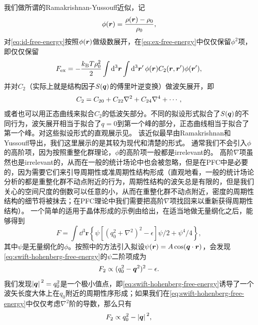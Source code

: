 \documentclass[hyperref, UTF8, a4paper]{ctexart}
\begin{document}
我们做所谓的Ramakrishnan-Yussouff近似，记
\begin{equation}
    \phi(\vb*{r}) = \frac{\rho(\vb*{r}) - \rho_0}{\rho_0},
\end{equation}
对\eqref{eq:id-free-energy}按照$\phi(\vb*{r})$做级数展开，在\eqref{eq:ex-free-energy}中仅仅保留$\phi^2$项，即仅仅保留
\begin{equation}
    F_\text{ex} = - \frac{k_\text{B} T \rho^2_0}{2} \int \dd[3]{\vb*{r}} \int \dd[3]{\vb*{r}'} {\phi(\vb*{r})} C_2(\vb*{r}, \vb*{r}') {\phi(\vb*{r}')}, 
\end{equation}
并对$C_2$（实际上就是结构因子$S(\vb*{q})$的傅里叶逆变换）做波矢展开，即
\begin{equation}
    C_2 = C_{20} + C_{22} \laplacian + C_{24} \nabla^4 + \cdots,
\end{equation}
或者也可以用正态曲线来拟合$C_2$的低波矢部分。不同的拟设形式拟合了$S(\vb*{q})$的不同行为，波矢展开相当于拟合了$q=0$到第一个峰的部分，正态曲线相当于拟合了第一个峰。对这些拟设形式的直观展示见。
该近似最早由Ramakrishnan和Yussouff导出\cite{PhysRevB.19.2775,Singh1991351}，我们这里展示的是其较为现代和清楚的形式\cite{pfc2009}。
通常我们不会引入$\phi$的高阶项，因为按照重整化群理论，$\phi$的高阶项一般都是irrelevant的\cite{kardar2007statistical}。
高阶$\nabla$项虽然也是irrelevant的，从而在一般的统计场论中也会被忽略，但是在PFC中是必要的，因为需要它们来引导周期性或准周期性结构形成（直观地看，一般的统计场论分析的都是重整化群不动点附近的行为，周期性结构的波矢总是有限的，但是我们关心的空间尺度的倒数可以任意的小，从而在重整化群不动点附近，密度的周期性结构的细节将被抹去；在PFC理论中我们需要把高阶$\nabla$项找回来以重新获得周期性结构）。
一个简单的适用于晶体形成的示例由\cite{PhysRevLett.88.245701}给出，在适当地做无量纲化之后，能够得到
\begin{equation}
    F = \int \dd^3 \boldsymbol{r}\left\{\psi\left[\left(q_{0}^{2}+\nabla^{2}\right)^{2}-\epsilon\right] \psi / 2+\psi^{4} / 4\right\},
    \label{eq:swift-hohenberg-free-energy}
\end{equation}
其中$\psi$是无量纲化的$\phi$。按照\cite{PhysRevE.70.051605}中的方法引入拟设$\psi(\vb*{r}) = A \cos(\vb*{q} \cdot \vb*{r})$，会发现\eqref{eq:swift-hohenberg-free-energy}的$\psi$二阶项成为
\[
    F_2 \propto (q_0^2 - \vb*{q}^2)^2 - \epsilon.
\]
我们发现$\abs*{\vb*{q}}^2 = q_0^2$是一个极小值点，即\eqref{eq:swift-hohenberg-free-energy}诱导了一个波矢长度大体上在$q_0$附近的周期性序形成；如果我们在\eqref{eq:swift-hohenberg-free-energy}中仅仅考虑$\nabla^2$阶的导数，那么只有
\[
    F_2 \propto q_0^2 - \abs*{\vb*{q}}^2,
\]
\end{document}
